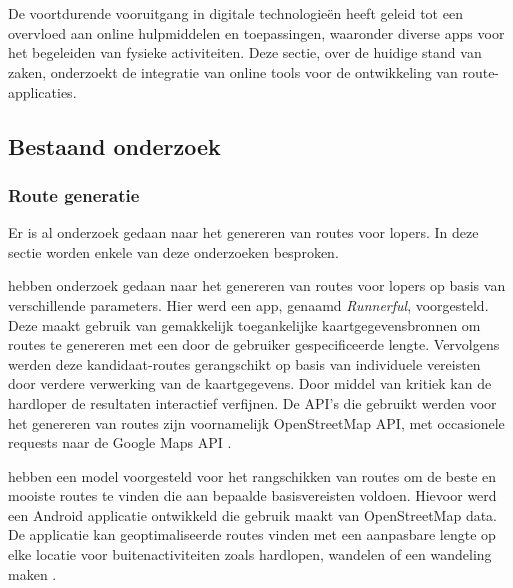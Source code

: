 \chapter{}%
\label{ch:stand-van-zaken}



De voortdurende vooruitgang in digitale technologieën heeft geleid tot een overvloed aan online hulpmiddelen en toepassingen,
waaronder diverse apps voor het begeleiden van fysieke activiteiten.
Deze sectie, over de huidige stand van zaken, onderzoekt de integratie van online tools voor de ontwikkeling van route-applicaties.

\section{Bestaand onderzoek}

    \subsection{Route generatie}

    Er is al onderzoek gedaan naar het genereren van routes voor lopers. In deze sectie worden enkele van deze onderzoeken besproken.
    
    \textcite{Loepp2018} hebben onderzoek gedaan naar het genereren van routes voor lopers op basis van verschillende parameters.
    Hier werd een app, genaamd \emph{Runnerful}, voorgesteld.
    Deze maakt gebruik van gemakkelijk toegankelijke kaartgegevensbronnen om routes te genereren met een door de gebruiker gespecificeerde lengte.
    Vervolgens werden  deze kandidaat-routes gerangschikt op basis van individuele vereisten door verdere verwerking van de kaartgegevens.
    Door middel van kritiek kan de hardloper de resultaten interactief verfijnen.
    De API's die gebruikt werden voor het genereren van routes zijn voornamelijk OpenStreetMap API,
    met occasionele requests naar de Google Maps API \autocite{Loepp2018}.

    \textcite{Schulze2016} hebben een model voorgesteld voor het rangschikken van routes om de beste en mooiste routes te vinden
    die aan bepaalde basisvereisten voldoen. Hievoor werd een Android applicatie ontwikkeld die gebruik maakt van OpenStreetMap data.
    De applicatie kan geoptimaliseerde routes vinden met een aanpasbare lengte op elke locatie voor buitenactiviteiten 
    zoals hardlopen, wandelen of een wandeling maken \autocite{Schulze2016}.

